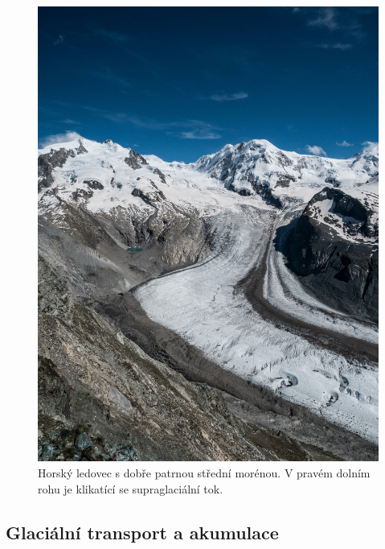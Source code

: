 \begin{figure}
	\centering
	\includegraphics[width=1\linewidth]{obrazky/glac/ledovec_svyc}
	\caption{Horský ledovec s dobře patrnou střední morénou. V pravém dolním rohu je klikatící se supraglaciální tok.}
	\label{fig:ledovec}
\end{figure}


\subsection{Glaciální transport a akumulace}

